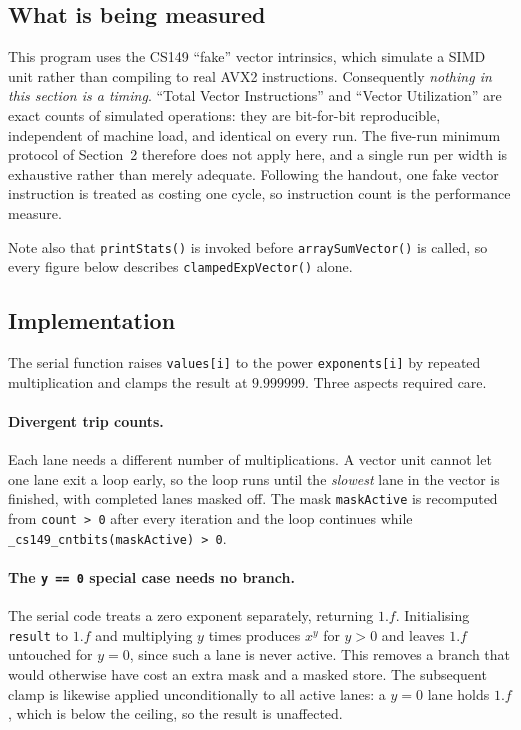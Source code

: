 \documentclass[11pt,a4paper]{article}
\begin{document}
\subsection{What is being measured}
\label{sec:p2what}

This program uses the CS149 ``fake'' vector intrinsics, which simulate a SIMD
unit rather than compiling to real AVX2 instructions. Consequently
\emph{nothing in this section is a timing}. ``Total Vector Instructions'' and
``Vector Utilization'' are exact counts of simulated operations: they are
bit-for-bit reproducible, independent of machine load, and identical on every
run. The five-run minimum protocol of Section~2 therefore does not apply here,
and a single run per width is exhaustive rather than merely adequate. Following
the handout, one fake vector instruction is treated as costing one cycle, so
instruction count is the performance measure.

Note also that \texttt{printStats()} is invoked before \texttt{arraySumVector()}
is called, so every figure below describes \texttt{clampedExpVector()} alone.

\subsection{Implementation}

The serial function raises \texttt{values[i]} to the power
\texttt{exponents[i]} by repeated multiplication and clamps the result at
$9.999999$. Three aspects required care.

\paragraph{Divergent trip counts.} Each lane needs a different number of
multiplications. A vector unit cannot let one lane exit a loop early, so the
loop runs until the \emph{slowest} lane in the vector is finished, with
completed lanes masked off. The mask \texttt{maskActive} is recomputed from
\texttt{count > 0} after every iteration and the loop continues while
\texttt{\_cs149\_cntbits(maskActive) > 0}.

\paragraph{The \texttt{y == 0} special case needs no branch.} The serial code
treats a zero exponent separately, returning $1.f$. Initialising
\texttt{result} to $1.f$ and multiplying $y$ times produces $x^y$ for $y > 0$
and leaves $1.f$ untouched for $y = 0$, since such a lane is never active. This
removes a branch that would otherwise have cost an extra mask and a masked
store. The subsequent clamp is likewise applied unconditionally to all active
lanes: a $y = 0$ lane holds $1.f$, which is below the ceiling, so the result is
unaffected.
\end{document}
